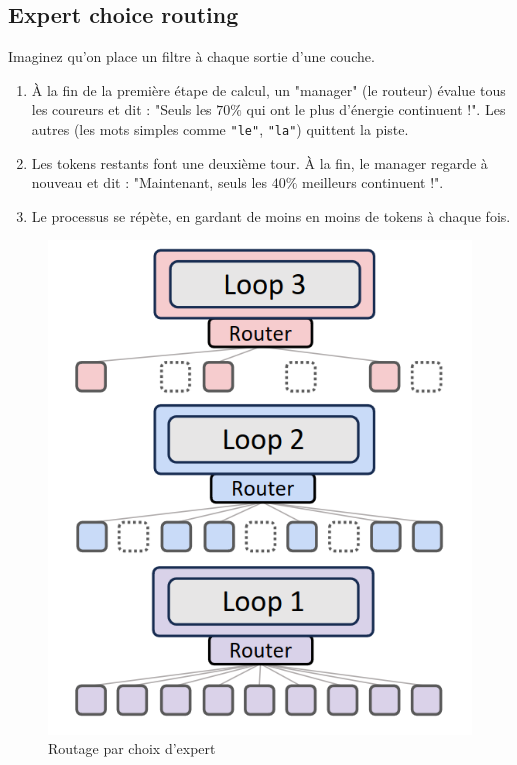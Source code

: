 \documentclass[a4paper]{article}
\begin{document}
\subsection{Expert choice routing}
Imaginez qu'on place un filtre à chaque sortie d'une couche.

\begin{enumerate}
  \item À la fin de la première étape de calcul, un "manager" (le routeur)
  évalue tous les coureurs et dit : "Seuls les $70\%$ qui ont le plus d'énergie
  continuent !". Les autres (les mots simples comme \texttt{"le"},
  \texttt{"la"}) quittent la piste.
  
  \item Les tokens restants font une deuxième tour. À la fin, le manager
  regarde à nouveau et dit : "Maintenant, seuls les $40\%$ meilleurs
  continuent !".

  \item Le processus se répète, en gardant de moins en moins de tokens
  à chaque fois.
\end{enumerate}

\begin{figure}[h]
  \centering
  \includegraphics[scale=0.4]{images/expert_choice_routing.png}
  \caption{Routage par choix d'expert \cite{bae2025mixtureofrecursionslearningdynamicrecursive}}
  \label{fig:expert-choice-routing}
\end{figure}
\end{document}

